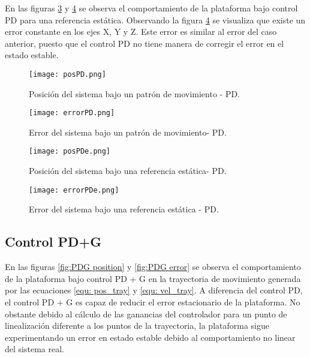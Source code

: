 En las figuras \ref{fig:PD positione} y \ref{fig:PD errore} se observa el comportamiento de la plataforma bajo control PD para una referencia estática. 
Observando la figura \ref{fig:PD errore} se visualiza que existe un error constante en los ejes X, Y y Z. 
Este error es similar al error del caso anterior, puesto que el control PD no tiene manera de corregir el error en el estado estable.


\begin{figure}[H]
    \centering
    \texttt{[image: posPD.png]}
    \caption{Posición del sistema bajo un patrón de movimiento - PD.}
    \label{fig:PD position}
\end{figure}

\begin{figure}[H]
    \centering
    \texttt{[image: errorPD.png]}
    \caption{Error del sistema bajo un patrón de movimiento- PD.}
    \label{fig:PD error}
\end{figure}

\begin{figure}[H]
    \centering
    \texttt{[image: posPDe.png]}
    \caption{Posición del sistema bajo una referencia estática- PD.}
    \label{fig:PD positione}
\end{figure}

\begin{figure}[H]
    \centering
    \texttt{[image: errorPDe.png]}
    \caption{Error del sistema bajo una referencia estática - PD.}
    \label{fig:PD errore}
\end{figure}



\subsection{Control PD+G}

En las figuras \ref{fig:PDG position} y \ref{fig:PDG error} se observa el comportamiento de la plataforma bajo control PD + G en la trayectoria de movimiento generada por las ecuaciones \ref{equ: pos_tray} y \ref{equ: vel_tray}. 
A diferencia del control PD, el control PD + G es capaz de reducir el error estacionario de la plataforma. 
No obstante debido al cálculo de las ganancias del controlador para un punto de linealización diferente a los puntos de la trayectoria,
la plataforma sigue experimentando un error en estado estable debido al comportamiento no linear del sistema real.

